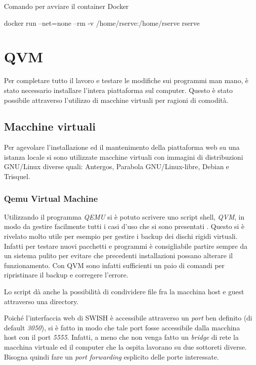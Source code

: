 \documentclass[10pt,titlepage,twoside,a4paper]{report}
\newenvironment{code}{\singlespacing\captionsetup{type=listing}}{}
\begin{document}
\begin{code}
    \caption{Comando per avviare il container Docker}
    \begin{shellcode*}{}
docker run --net=none --rm -v /home/rserve:/home/rserve rserve
    \end{shellcode*}
    \label{lst:dockerruncommand}
\end{code}


\section{QVM}
Per completare tutto il lavoro e testare le modifiche sui programmi man 
mano, è stato necessario installare l'intera piattaforma sul computer. 
Questo è stato possibile attraverso l'utilizzo di macchine virtuali 
per ragioni di comodità.

\subsection{Macchine virtuali}
Per agevolare l'installazione ed il mantenimento della piattaforma web su una 
istanza locale si sono utilizzate macchine virtuali con immagini di 
distribuzioni GNU/Linux diverse quali: Antergos, Parabola GNU/Linux-libre, 
Debian e Trisquel.

\subsubsection{Qemu Virtual Machine}
Utilizzando il programma \emph{QEMU} \cite{qemu} si è potuto scrivere uno
script shell, \emph{QVM}, in modo da gestire facilmente tutti i casi d'uso che 
si sono presentati \cite{qvm}. Questo si è rivelato molto utile per esempio per 
gestire i backup dei dischi rigidi virtuali. Infatti per testare nuovi 
pacchetti e programmi è consigliabile partire sempre da un sistema pulito
per evitare che precedenti installazioni possano alterare il funzionamento.
Con QVM sono infatti sufficienti un paio di comandi per ripristinare il 
backup e corregere l'errore.

Lo script dà anche la possibilità di condividere file fra la macchina host 
e guest attraverso una directory.

Poiché l'interfaccia web di SWISH è accessibile attraverso un \emph{port} 
ben definito (di default \emph{3050}), si è fatto in modo che tale port 
fosse accessibile dalla macchina host con il port \emph{5555}. Infatti, a meno 
che non venga fatto un \emph{bridge} di rete la macchina virtuale ed il 
computer che la ospita lavorano su due sottoreti diverse. Bisogna quindi fare
un \emph{port forwarding} esplicito delle porte interessate.
\end{document}
